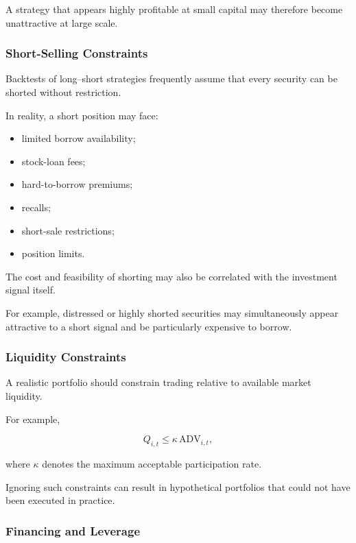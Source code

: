 \documentclass[11pt,a4paper]{article}
\begin{document}
A strategy that appears highly profitable at small capital may therefore become
unattractive at large scale.


\subsubsection{Short-Selling Constraints}

Backtests of long--short strategies frequently assume that every security can
be shorted without restriction.

In reality, a short position may face:

\begin{itemize}
    \item limited borrow availability;
    \item stock-loan fees;
    \item hard-to-borrow premiums;
    \item recalls;
    \item short-sale restrictions;
    \item position limits.
\end{itemize}

The cost and feasibility of shorting may also be correlated with the investment
signal itself.

For example, distressed or highly shorted securities may simultaneously appear
attractive to a short signal and be particularly expensive to borrow.


\subsubsection{Liquidity Constraints}

A realistic portfolio should constrain trading relative to available market
liquidity.

For example,

\begin{equation}
Q_{i,t}
\leq
\kappa
\,
\mathrm{ADV}_{i,t},
\end{equation}

where $\kappa$ denotes the maximum acceptable participation rate.

Ignoring such constraints can result in hypothetical portfolios that could not
have been executed in practice.


\subsubsection{Financing and Leverage}
\end{document}
